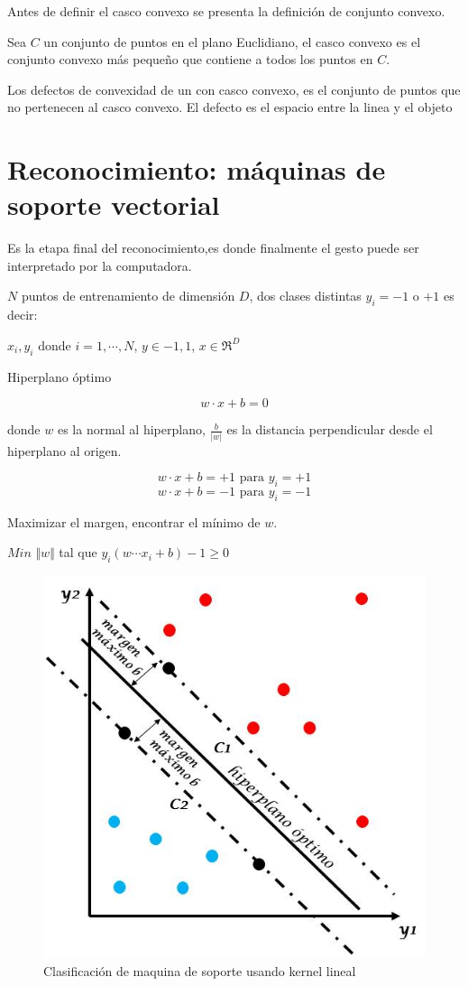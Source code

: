Antes de definir el casco convexo se presenta la definición de conjunto convexo. 
 

Sea $C$ un conjunto de puntos en el plano Euclidiano, el casco convexo es el conjunto convexo más pequeño que contiene a todos los puntos en $C$. 

Los defectos de convexidad de un con casco convexo, es el conjunto de puntos que no pertenecen al casco convexo. El defecto es el espacio entre la linea y el objeto  



\section{Reconocimiento: m\'aquinas de soporte vectorial}\label{sec:SVM} 
Es la etapa final del reconocimiento,es donde finalmente el gesto puede ser interpretado por la computadora.  

$N$ puntos de entrenamiento de dimensión $D$, dos clases distintas $y_i=-1$
o $+1$ es decir: 

${x_i,y_i}$ donde $i=1, \cdots ,N$, $y\in{-1,1}$, $x \in \Re^D$  

Hiperplano óptimo 
 
$$ w \cdot x + b = 0$$ 

donde $w$ es la normal al hiperplano, $\frac{b}{|w|}$ es la distancia perpendicular desde el hiperplano al origen.   

$$ w \cdot x + b = +1 \textrm{ para } y_i=+1$$ 
$$ w \cdot x + b = -1 \textrm{ para } y_i=-1$$ 

Maximizar el margen, encontrar el mínimo de $w$.  

$Min$ $\Vert w \Vert$ tal que $y_i(w \cdots x_i + b) -1 \geq 0$
 
\begin{figure}[!h]
\begin{center}
\includegraphics[scale=.3]{./Figures/maquinaSoporte.jpg}
\end{center}
\caption{Clasificación de maquina de soporte usando kernel lineal}
\label{fig:SVM}
\end{figure} 


\newpage
